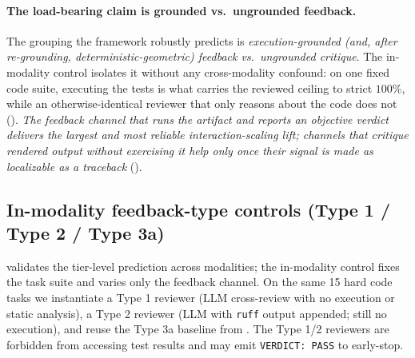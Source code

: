 \documentclass[11pt]{article}
\begin{document}
\paragraph{The load-bearing claim is grounded vs.\ ungrounded feedback.} The grouping the framework robustly predicts is \emph{execution-grounded (and, after re-grounding, deterministic-geometric) feedback vs.\ ungrounded critique}. The in-modality control isolates it without any cross-modality confound: on one fixed code suite, executing the tests is what carries the reviewed ceiling to strict $100\%$, while an otherwise-identical reviewer that only reasons about the code does not (). \emph{The feedback channel that runs the artifact and reports an objective verdict delivers the largest and most reliable interaction-scaling lift; channels that critique rendered output without exercising it help only once their signal is made as localizable as a traceback} ().

\subsection{In-modality feedback-type controls (Type 1 / Type 2 / Type 3a)}
\label{sec:harness-typecontrols}

 validates the tier-level prediction across modalities; the in-modality control fixes the task suite and varies only the feedback channel. On the same 15 hard code tasks we instantiate a Type 1 reviewer (LLM cross-review with no execution or static analysis), a Type 2 reviewer (LLM with \texttt{ruff} output appended; still no execution), and reuse the Type 3a baseline from . The Type 1/2 reviewers are forbidden from accessing test results and may emit \texttt{VERDICT: PASS} to early-stop.
\end{document}
